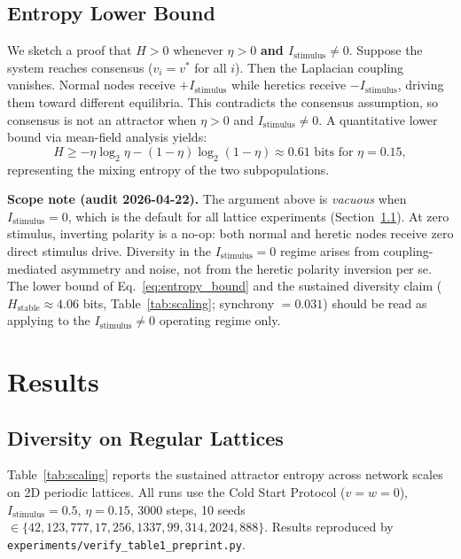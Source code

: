 \documentclass[11pt]{article}
\begin{document}
\subsection{Entropy Lower Bound}

We sketch a proof that $H > 0$ whenever $\eta > 0$ \textbf{and $I_{\text{stimulus}} \neq 0$}. Suppose the system reaches consensus ($v_i = v^*$ for all $i$). Then the Laplacian coupling vanishes. Normal nodes receive $+I_{\text{stimulus}}$ while heretics receive $-I_{\text{stimulus}}$, driving them toward different equilibria. This contradicts the consensus assumption, so consensus is not an attractor when $\eta > 0$ and $I_{\text{stimulus}} \neq 0$. A quantitative lower bound via mean-field analysis yields:
\begin{equation}
H \geq -\eta \log_2 \eta - (1 - \eta) \log_2(1 - \eta) \approx 0.61 \text{ bits for } \eta = 0.15,
\label{eq:entropy_bound}
\end{equation}
representing the mixing entropy of the two subpopulations.

\textbf{Scope note (audit 2026-04-22).} The argument above is \emph{vacuous} when $I_{\text{stimulus}} = 0$, which is the default for all lattice experiments (Section~\ref{sec:results_lattice}). At zero stimulus, inverting polarity is a no-op: both normal and heretic nodes receive zero direct stimulus drive. Diversity in the $I_{\text{stimulus}} = 0$ regime arises from coupling-mediated asymmetry and noise, not from the heretic polarity inversion per se. The lower bound of Eq.~\ref{eq:entropy_bound} and the sustained diversity claim ($H_{\text{stable}} \approx 4.06$ bits, Table~\ref{tab:scaling}; synchrony $= 0.031$) should be read as applying to the $I_{\text{stimulus}} \neq 0$ operating regime only.

\section{Results}
\label{sec:results}

\subsection{Diversity on Regular Lattices}
\label{sec:results_lattice}

Table~\ref{tab:scaling} reports the sustained attractor entropy across network scales on 2D periodic lattices. All runs use the Cold Start Protocol ($v = w = 0$), $I_{\text{stimulus}} = 0.5$, $\eta = 0.15$, 3000 steps, 10 seeds $\in \{42, 123, 777, 17, 256, 1337, 99, 314, 2024, 888\}$. Results reproduced by \texttt{experiments/verify\_table1\_preprint.py}.
\end{document}
